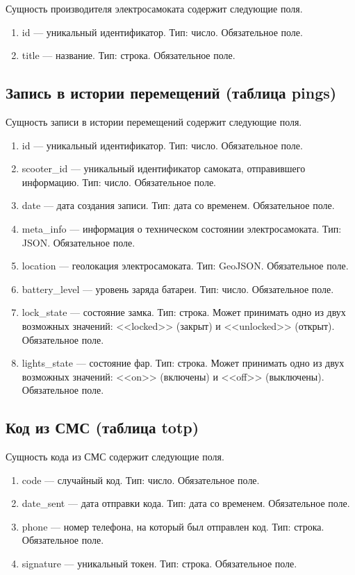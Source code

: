 Сущность производителя электросамоката содержит следующие поля.

\begin{enumerate}
    \item id --- уникальный идентификатор. Тип: число. Обязательное поле.
    \item title --- название. Тип: строка. Обязательное поле.
\end{enumerate}

\subsection{Запись в истории перемещений (таблица pings)}

Сущность записи в истории перемещений содержит следующие поля.

\begin{enumerate}
    \item id --- уникальный идентификатор. Тип: число. Обязательное поле.
    \item scooter\_id --- уникальный идентификатор самоката, отправившего информацию. Тип: число. Обязательное поле.
    \item date --- дата создания записи. Тип: дата со временем. Обязательное поле.
    \item meta\_info --- информация о техническом состоянии электросамоката. Тип: JSON. Обязательное поле.
    \item location --- геолокация электросамоката. Тип: GeoJSON. Обязательное поле.
    \item battery\_level --- уровень заряда батареи. Тип: число. Обязательное поле.
    \item lock\_state --- состояние замка. Тип: строка. Может принимать одно из двух возможных значений: <<locked>> (закрыт) и <<unlocked>> (открыт). Обязательное поле.
    \item lights\_state --- состояние фар. Тип: строка. Может принимать одно из двух возможных значений: <<on>> (включены) и <<off>> (выключены). Обязательное поле.
\end{enumerate}

\subsection{Код из СМС (таблица totp)}

Сущность кода из СМС содержит следующие поля.

\begin{enumerate}
    \item code --- случайный код. Тип: число. Обязательное поле.
    \item date\_sent --- дата отправки кода. Тип: дата со временем. Обязательное поле.
    \item phone --- номер телефона, на который был отправлен код. Тип: строка. Обязательное поле.
    \item signature --- уникальный токен. Тип: строка. Обязательное поле.
\end{enumerate}

